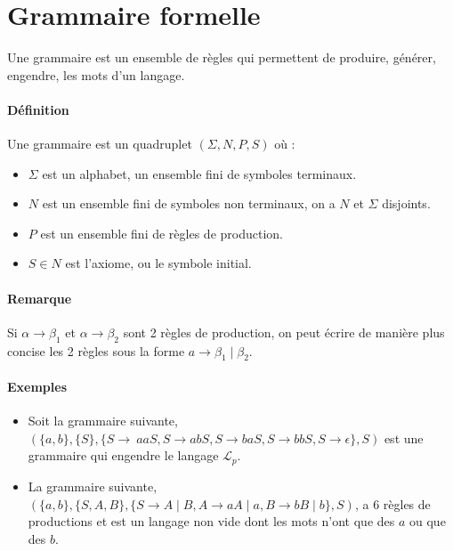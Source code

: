 

\section{Grammaire formelle} %
\label{sec:grammaire_formelle}

Une grammaire est un ensemble de règles qui permettent de produire, générer, engendre, les mots d'un langage.


\paragraph{Définition} %
\label{par:d_finition}

Une grammaire est un quadruplet $(\Sigma,N,P,S)$ où :

\begin{itemize}
	\item $\Sigma$ est un alphabet, un ensemble fini de symboles terminaux.
	\item $N$ est un ensemble fini de symboles non terminaux, on a $N$ et $\Sigma$ disjoints.
	\item $P$ est un ensemble fini de règles de production.
	\item $S \in N$ est l'axiome, ou le symbole initial.
\end{itemize}



\paragraph{Remarque} %
\label{par:remarque}

Si $\alpha \rightarrow \beta_1$ et $\alpha \rightarrow \beta_2$ sont 2 règles de production, on peut écrire de manière plus concise les 2 règles sous la forme $a \rightarrow \beta_1 \mid \beta_2$.



\paragraph{Exemples} %
\label{par:exemples}

\begin{itemize}
	\item Soit la grammaire suivante, $(\{a,b\},\{S\},\{S \rightarrow\ aaS, S \rightarrow abS, S \rightarrow baS, S \rightarrow bbS, S \rightarrow \epsilon\},S)$ est une grammaire qui engendre le langage $\mathcal{L}_p$.

	\item La grammaire suivante, $(\{a,b\},\{S,A,B\},\{S \rightarrow A \mid B, A\rightarrow aA \mid a, B \rightarrow bB\mid b\},S)$, a 6 règles de productions et est un langage non vide dont les mots n'ont que des $a$ ou que des $b$.
\end{itemize}

